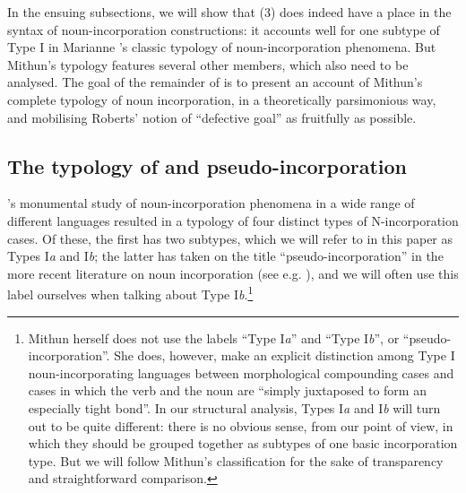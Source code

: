 \documentclass[output=paper]{langsci/langscibook}
\newcommand{\posscite}[1]{\citeauthor{#1}'s \citeyearpar{#1}}
\begin{document}
\begin{refcontext}
In the ensuing subsections, we will show that (3) does indeed have a place in
the syntax of noun-incorporation constructions: it accounts well for one
subtype of Type I in Marianne \posscite{mithun84} classic typology of
noun-incorporation phenomena. But Mithun’s typology features several other
members, which also need to be analysed. The goal of the remainder of
 is to present an account of Mithun’s complete typology of noun
incorporation, in a theoretically parsimonious way, and mobilising Roberts’
notion of \enquote{defective goal} as fruitfully as possible.\largerpage[-1]

\subsection{The typology of  and pseudo-incorporation}
\posscite{mithun84} monumental study of noun-incorporation phenomena in a wide range of different
languages resulted in a typology of four distinct types of N-incorporation cases. Of these, the first
has two subtypes, which we will refer to in this paper as Types I\emph{a} and I\emph{b}; the latter has taken on the
title \enquote{pseudo-incorporation} in the more recent literature on noun
incorporation (see e.g. \citealt{massam01}), and we will often use this label
ourselves when talking about Type I\emph{b}.\footnote{Mithun herself does not
    use the labels \enquote{Type I\emph{a}} and \enquote{Type I\emph{b}}, or
    \enquote{pseudo-incorporation}. She does, however, make an explicit
    distinction among Type I noun-incorporating languages between morphological
    compounding cases and cases in which the verb and the noun are
    \enquote{simply juxtaposed to form an especially tight bond}. In our
    structural analysis, Types I\emph{a} and I\emph{b} will turn out to be
    quite different: there is no obvious sense, from our point of view, in
    which they should be grouped together as subtypes of one basic
incorporation type. But we will follow Mithun’s classification for the sake of
transparency and straightforward comparison.}


\end{refcontext}
\end{document}
